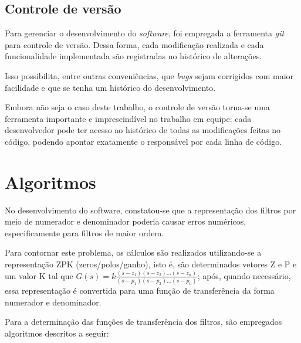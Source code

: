 \subsection{Controle de versão}

Para gerenciar o desenvolvimento do \textit{software}, foi empregada a ferramenta \textit{git} para controle de versão. Dessa forma, cada modificação realizada e cada funcionalidade implementada são registradas no histórico de alterações.

Isso possibilita, entre outras conveniências, que \textit{bugs} sejam corrigidos com maior facilidade e que se tenha um histórico do desenvolvimento.

Embora não seja o caso deste trabalho, o controle de versão torna-se uma ferramenta importante e imprescindível no trabalho em equipe: cada desenvolvedor pode ter acesso ao histórico de todas as modificações feitas no código, podendo apontar exatamente o responsável por cada linha de código.

\section{Algoritmos}

No desenvolvimento do software, constatou-se que a representação dos filtros por meio de numerador e denominador poderia causar erros numéricos, especificamente para filtros de maior ordem. 

Para contornar este problema, os cálculos são realizados utilizando-se a representação ZPK (zeros/polos/ganho), isto é, são determinados vetores Z e P e um valor K tal que $G(s) = k \frac{(s - z_1) (s-z_2) \dots (s - z_n)}{(s - p_1)(s - p_2) \dots (s - p_n)}$; após, quando necessário, essa representação é convertida para uma função de transferência da forma numerador e denominador.

Para a determinação das funções de transferência dos filtros, são empregados algoritmos descritos a seguir:

